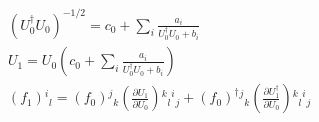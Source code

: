 
\begin{equation}
\begin{split}
&\left(U_0^{\dagger}U_0\right)^{-1/2}=c_0+\sum _i \frac{a_i}{U_0^{\dagger}U_0+b_i}\\
&U_1 = U_0\left(c_0+\sum _i \frac{a_i}{U_0^{\dagger}U_0+b_i}\right)\\
&(f_1){}^i{}_l = (f_0){}^j{}_k \left(\frac{\partial U_1}{\partial U_0}\right){}^k{}_l{}^i{}_j +  (f_0)^{\dagger}{}^j{}_k \left(\frac{\partial U_1^{\dagger}}{\partial U_0}\right){}^k{}_l{}^i{}_j\\
\end{split}
\end{equation}

